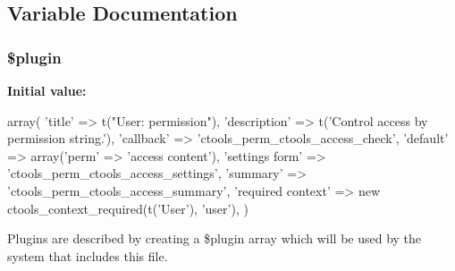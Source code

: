 \subsection{Variable Documentation}
\hypertarget{perm_8inc_ada8a7130088351710bb02ed622d6bf65}{
\subsubsection[{\$plugin}]{\setlength{\rightskip}{0pt plus 5cm}\$plugin}}
\label{perm_8inc_ada8a7130088351710bb02ed622d6bf65}
{\bfseries Initial value:}
\begin{DoxyCode}
 array(
  'title' => t("User: permission"),
  'description' => t('Control access by permission string.'),
  'callback' => 'ctools_perm_ctools_access_check',
  'default' => array('perm' => 'access content'),
  'settings form' => 'ctools_perm_ctools_access_settings',
  'summary' => 'ctools_perm_ctools_access_summary',
  'required context' => new ctools_context_required(t('User'), 'user'),
)
\end{DoxyCode}
Plugins are described by creating a \$plugin array which will be used by the system that includes this file. 